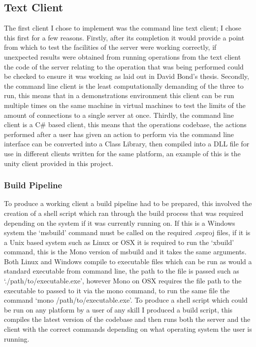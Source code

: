 \documentclass{article}
\begin{document}
\subsection{Text Client}
The first client I chose to implement was the command line text client; I chose this first for a few reasons. Firstly, after its completion it would provide a point from which to test the facilities of the server were working correctly, if unexpected results were obtained from running operations from the text client the code of the server relating to the operation that was being performed could be checked to ensure it was working as laid out in David Bond’s thesis. Secondly, the command line client is the least computationally demanding of the three to run, this means that in a demonstrations environment this client can be run multiple times on the same machine in virtual machines to test the limits of the amount of connections to a single server at once. Thirdly, the command line client is a C\# based client, this means that the operations codebase, the actions performed after a user has given an action to perform via the command line interface can be converted into a Class Library, then compiled into a DLL file for use in different clients written for the same platform, an example of this is the unity client provided in this project.
\subsubsection{Build Pipeline}
To produce a working client a build pipeline had to be prepared, this involved the creation of a shell script which ran through the build process that was required depending on the system if it was currently running on. If this is a Windows system the ‘msbuild’ command must be called on the required .csproj files, if it is a Unix based system such as Linux or OSX it is required to run the ‘xbuild’ command, this is the Mono version of msbuild and it takes the same arguments. Both Linux and Windows compile to executable files which can be run as would a standard executable from command line, the path to the file is passed such as ‘./path/to/executable.exe’, however Mono on OSX requires the file path to the executable to passed to it via the mono command, to run the same file the command ‘mono /path/to/executable.exe’. To produce a shell script which could be run on any platform by a user of any skill I produced a build script, this compiles the latest version of the codebase and then runs both the server and the client with the correct commands depending on what operating system the user is running.
\end{document}
